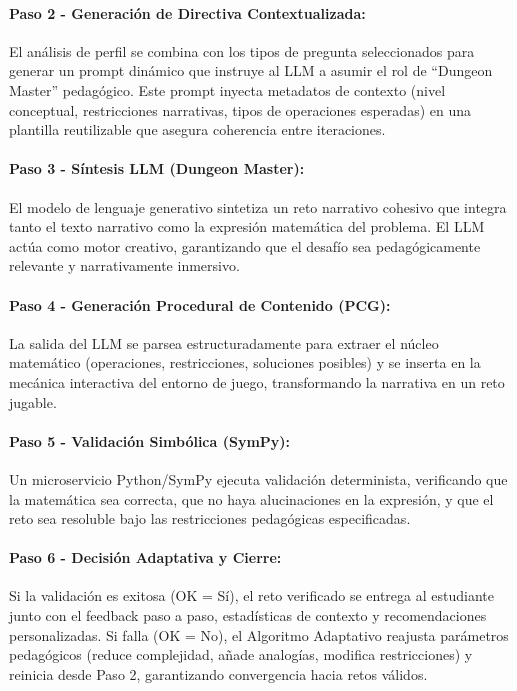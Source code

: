 \documentclass{ieeetj}
\begin{document}
\paragraph{Paso 2 - Generación de Directiva Contextualizada:} El análisis de perfil se combina con los tipos de pregunta seleccionados para generar un prompt dinámico que instruye al LLM a asumir el rol de ``Dungeon Master'' pedagógico. Este prompt inyecta metadatos de contexto (nivel conceptual, restricciones narrativas, tipos de operaciones esperadas) en una plantilla reutilizable que asegura coherencia entre iteraciones.

\paragraph{Paso 3 - Síntesis LLM (Dungeon Master):} El modelo de lenguaje generativo sintetiza un reto narrativo cohesivo que integra tanto el texto narrativo como la expresión matemática del problema. El LLM actúa como motor creativo, garantizando que el desafío sea pedagógicamente relevante y narrativamente inmersivo.

\paragraph{Paso 4 - Generación Procedural de Contenido (PCG):} La salida del LLM se parsea estructuradamente para extraer el núcleo matemático (operaciones, restricciones, soluciones posibles) y se inserta en la mecánica interactiva del entorno de juego, transformando la narrativa en un reto jugable.

\paragraph{Paso 5 - Validación Simbólica (SymPy):} Un microservicio Python/SymPy ejecuta validación determinista, verificando que la matemática sea correcta, que no haya alucinaciones en la expresión, y que el reto sea resoluble bajo las restricciones pedagógicas especificadas.

\paragraph{Paso 6 - Decisión Adaptativa y Cierre:} Si la validación es exitosa (OK = Sí), el reto verificado se entrega al estudiante junto con el feedback paso a paso, estadísticas de contexto y recomendaciones personalizadas. Si falla (OK = No), el Algoritmo Adaptativo reajusta parámetros pedagógicos (reduce complejidad, añade analogías, modifica restricciones) y reinicia desde Paso 2, garantizando convergencia hacia retos válidos.
\end{document}
